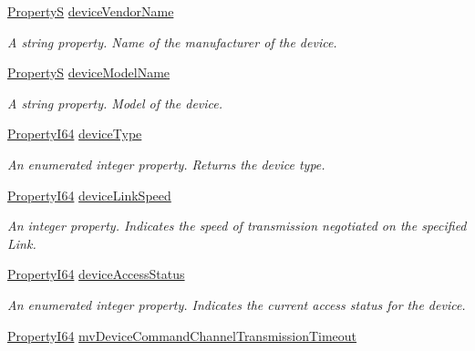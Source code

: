 \begin{DoxyCompactItemize}
\hyperlink{classmv_i_m_p_a_c_t_1_1acquire_1_1_property_s}{Property\+S} \hyperlink{classmv_i_m_p_a_c_t_1_1acquire_1_1_gen_i_cam_1_1_interface_module_a4522d853c2dce100407c9e37ca70d75a}{device\+Vendor\+Name}
\begin{DoxyCompactList}\small\item\em A string property. Name of the manufacturer of the device. \end{DoxyCompactList}\item 
\hyperlink{classmv_i_m_p_a_c_t_1_1acquire_1_1_property_s}{Property\+S} \hyperlink{classmv_i_m_p_a_c_t_1_1acquire_1_1_gen_i_cam_1_1_interface_module_a76e06ecae53f16c82df091d44c7516a4}{device\+Model\+Name}
\begin{DoxyCompactList}\small\item\em A string property. Model of the device. \end{DoxyCompactList}\item 
\hyperlink{group___common_interface_ga81749b2696755513663492664a18a893}{Property\+I64} \hyperlink{classmv_i_m_p_a_c_t_1_1acquire_1_1_gen_i_cam_1_1_interface_module_a1077f343fc10b330c861edc4fc53c501}{device\+Type}
\begin{DoxyCompactList}\small\item\em An enumerated integer property. Returns the device type. \end{DoxyCompactList}\item 
\hyperlink{group___common_interface_ga81749b2696755513663492664a18a893}{Property\+I64} \hyperlink{classmv_i_m_p_a_c_t_1_1acquire_1_1_gen_i_cam_1_1_interface_module_af3a2712bc9fcd0b70d13b22c9e30d3e3}{device\+Link\+Speed}
\begin{DoxyCompactList}\small\item\em An integer property. Indicates the speed of transmission negotiated on the specified Link. \end{DoxyCompactList}\item 
\hyperlink{group___common_interface_ga81749b2696755513663492664a18a893}{Property\+I64} \hyperlink{classmv_i_m_p_a_c_t_1_1acquire_1_1_gen_i_cam_1_1_interface_module_a4017b5d454159033952261c47af7ac2d}{device\+Access\+Status}
\begin{DoxyCompactList}\small\item\em An enumerated integer property. Indicates the current access status for the device. \end{DoxyCompactList}\item 
\hyperlink{group___common_interface_ga81749b2696755513663492664a18a893}{Property\+I64} \hyperlink{classmv_i_m_p_a_c_t_1_1acquire_1_1_gen_i_cam_1_1_interface_module_a66e495980177ae7627079146f5deafe3}{mv\+Device\+Command\+Channel\+Transmission\+Timeout}

\end{DoxyCompactItemize}
